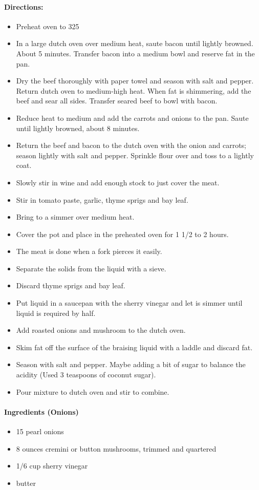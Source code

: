 \documentclass{article}
\begin{document}
\paragraph{Directions:}
\begin{itemize}
\item Preheat oven to 325
\item In a large dutch oven over medium heat, saute bacon until lightly browned. About 5 minutes. Transfer bacon into a medium bowl and reserve fat in the pan.
\item Dry the beef thoroughly with paper towel and season with salt and pepper. Return dutch oven to medium-high heat. When fat is shimmering, add the beef and sear all sides. Transfer seared beef to bowl with bacon.
\item Reduce heat to medium and add the carrots and onions to the pan. Saute until lightly browned, about 8 minutes.
\item Return the beef and bacon to the dutch oven with the onion and carrots; season lightly with salt and pepper. Sprinkle flour over and toss to a lightly coat.
\item Slowly stir in wine and add enough stock to just cover the meat.
\item Stir in tomato paste, garlic, thyme sprigs and bay leaf.
\item Bring to a simmer over medium heat. 
\item Cover the pot and place in the preheated oven for 1 1/2 to 2 hours.
\item The meat is done when a fork pierces it easily.
\item Separate the solids from the liquid with a sieve.
\item Discard thyme sprigs and bay leaf.
\item Put liquid in a saucepan with the sherry vinegar and let is simmer until liquid is required by half.
\item Add roasted onions and mushroom to the dutch oven.
\item Skim fat off the surface of the braising liquid with a laddle and discard fat.
\item Season with salt and pepper. Maybe adding a bit of sugar to balance the acidity (Used 3 teaspoons of coconut sugar).
\item Pour mixture to dutch oven and stir to combine.
\end{itemize}

\paragraph{Ingredients (Onions)}
\begin{itemize}
	\item 15 pearl onions
	\item 8 ounces cremini or button mushrooms, trimmed and quartered
	\item 1/6 cup sherry vinegar
	\item butter
\end{itemize}
\end{document}

